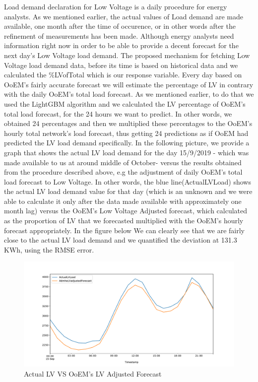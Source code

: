 \par Load demand declaration for Low Voltage is a daily procedure for energy analysts. As we mentioned earlier, the actual values of Load demand are made available, one month after the time of occurence, or in other words after the refinement of measurements has been made. Although energy analysts need information right now in order to be able to provide a decent forecast for the next day's Low Voltage load demand. The proposed mechanism for fetching Low Voltage load demand data, before its time is based on historical data and we calculated the \%LVofTotal which is our response variable. Every day based on OoEM's fairly accurate forecast we will estimate the percentage of LV in contrary with the daily OoEM's total load forecast. As we mentioned earlier, to do that we used the LightGBM algorithm and we calculated the LV percentage of OoEM's total load forecast,  for the 24 hours we want to predict. In other words, we obtained 24 percentages and then we multiplied these percentages to the OoEM's hourly total network's load forecast, thus getting 24 predictions as if OoEM had predicted the LV load demand specifically. In the following picture, we provide a graph that shows the actual LV load demand for the day 15/9/2019 - which was made available to us at around middle of October- versus the results obtained from the procedure described above, e.g the adjustment of daily OoEM's total load forecast to Low Voltage. In other words, the blue line(ActualLVLoad) shows the actual LV load demand value for that day (which is an unknown and we were able to calculate it only after the data made available with approximately one month lag) versus the OoEM's Low Voltage Adjusted forecast, which calculated as the proportion of LV that we forecasted multiplied with the OoEM's hourly forecast appropriately. In the figure below We can clearly see that we are fairly close to the actual LV load demand and we quantified the deviation at 131.3 KWh, using the RMSE error.
\begin{figure}[ht!]
\centering
\includegraphics[width=1\linewidth]{project/loadadjustment.pdf}
\caption{ Actual LV VS OoEM's LV Adjusted Forecast}

\end{figure}
